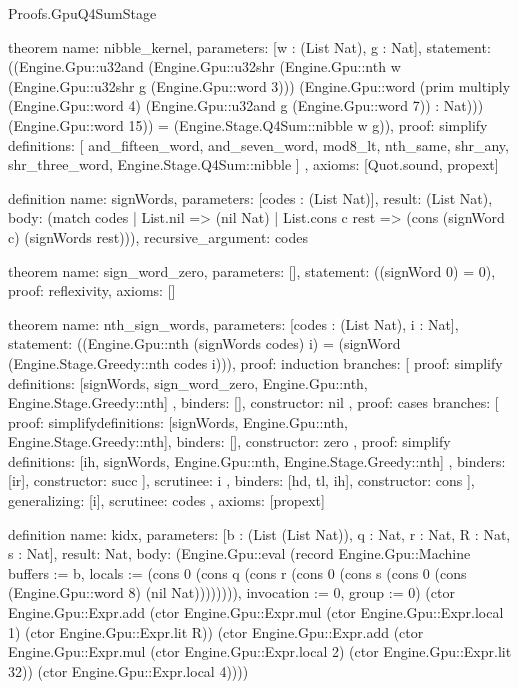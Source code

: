 \begin{lexlean}{Proofs.GpuQ4SumStage}
\begin{semanticmodule}
theorem{
  name: nibble_kernel,
  parameters: [w : (List Nat), g : Nat],
  statement: ((Engine.Gpu::u32and (Engine.Gpu::u32shr (Engine.Gpu::nth w (Engine.Gpu::u32shr g (Engine.Gpu::word 3))) (Engine.Gpu::word (prim multiply (Engine.Gpu::word 4) (Engine.Gpu::u32and g (Engine.Gpu::word 7)) : Nat))) (Engine.Gpu::word 15)) = (Engine.Stage.Q4Sum::nibble w g)),
  proof: simplify{
    definitions: [
      and_fifteen_word,
      and_seven_word,
      mod8_lt,
      nth_same,
      shr_any,
      shr_three_word,
      Engine.Stage.Q4Sum::nibble
    ]
  },
  axioms: [Quot.sound, propext]
}

definition{
  name: signWords,
  parameters: [codes : (List Nat)],
  result: (List Nat),
  body: (match codes
    | List.nil => (nil Nat)
    | List.cons c rest => (cons (signWord c) (signWords rest))),
  recursive_argument: codes
}

theorem{
  name: sign_word_zero,
  parameters: [],
  statement: ((signWord 0) = 0),
  proof: reflexivity{},
  axioms: []
}

theorem{
  name: nth_sign_words,
  parameters: [codes : (List Nat), i : Nat],
  statement: ((Engine.Gpu::nth (signWords codes) i) = (signWord (Engine.Stage.Greedy::nth codes i))),
  proof: induction{
    branches: [
      {
        proof: simplify{
          definitions: [signWords, sign_word_zero, Engine.Gpu::nth, Engine.Stage.Greedy::nth]
        },
        binders: [],
        constructor: nil
      },
      {
        proof: cases{
          branches: [
            {
              proof: simplify{definitions: [signWords, Engine.Gpu::nth, Engine.Stage.Greedy::nth]},
              binders: [],
              constructor: zero
            },
            {
              proof: simplify{
                definitions: [ih, signWords, Engine.Gpu::nth, Engine.Stage.Greedy::nth]
              },
              binders: [ir],
              constructor: succ
            }
          ],
          scrutinee: i
        },
        binders: [hd, tl, ih],
        constructor: cons
      }
    ],
    generalizing: [i],
    scrutinee: codes
  },
  axioms: [propext]
}

definition{
  name: kidx,
  parameters: [b : (List (List Nat)), q : Nat, r : Nat, R : Nat, s : Nat],
  result: Nat,
  body: (Engine.Gpu::eval (record Engine.Gpu::Machine {buffers := b, locals := (cons 0 (cons q (cons r (cons 0 (cons s (cons 0 (cons (Engine.Gpu::word 8) (nil Nat)))))))), invocation := 0, group := 0}) (ctor Engine.Gpu::Expr.add (ctor Engine.Gpu::Expr.mul (ctor Engine.Gpu::Expr.local 1) (ctor Engine.Gpu::Expr.lit R)) (ctor Engine.Gpu::Expr.add (ctor Engine.Gpu::Expr.mul (ctor Engine.Gpu::Expr.local 2) (ctor Engine.Gpu::Expr.lit 32)) (ctor Engine.Gpu::Expr.local 4))))
}


\end{semanticmodule}
\end{lexlean}
